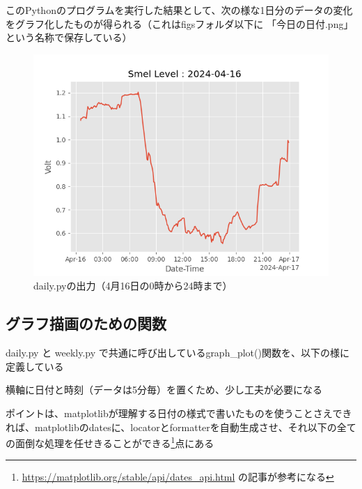 \documentclass[12pt,a4paper,uplatex]{jsarticle}
\begin{document}
\newpage

このPythonのプログラムを実行した結果として、次の様な1日分のデータの変化をグラフ化したものが得られる（これはfigsフォルダ以下に 「今日の日付.png」 という名称で保存している）

\begin{figure}[htbp]
	\begin{minipage}[b]{1.0\linewidth}
		\centering
		\includegraphics[keepaspectratio, scale=0.8]{figs/png/2024-04-16.png}
		\caption{daily.pyの出力（4月16日の0時から24時まで）}
	\end{minipage}
\end{figure}

\subsection{グラフ描画のための関数}

daily.py と weekly.py で共通に呼び出しているgraph\_plot()関数を、以下の様に定義している

横軸に日付と時刻（データは5分毎）を置くため、少し工夫が必要になる

ポイントは、matplotlibが理解する日付の様式で書いたものを使うことさえできれば、matplotlibのdatesに、locatorとformatterを自動生成させ、それ以下の全ての面倒な処理を任せきることができる\footnote{\url{https://matplotlib.org/stable/api/dates_api.html}
	の記事が参考になる}点にある
\end{document}
